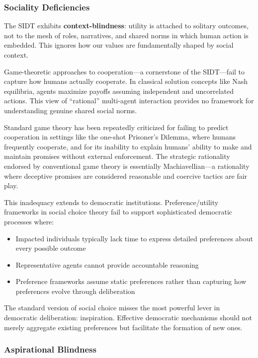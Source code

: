 \subsubsection{Sociality Deficiencies}

The SIDT exhibits \textbf{context-blindness}: utility is attached to solitary outcomes, not to the mesh of roles, narratives, and shared norms in which human action is embedded. This ignores how our values are fundamentally shaped by social context.

Game-theoretic approaches to cooperation—a cornerstone of the SIDT—fail to capture how humans actually cooperate. In classical solution concepts like Nash equilibria, agents maximize payoffs assuming independent and uncorrelated actions. This view of ``rational'' multi-agent interaction provides no framework for understanding genuine shared social norms.

Standard game theory has been repeatedly criticized for failing to predict cooperation in settings like the one-shot Prisoner's Dilemma, where humans frequently cooperate, and for its inability to explain humans' ability to make and maintain promises without external enforcement. The strategic rationality endorsed by conventional game theory is essentially Machiavellian—a rationality where deceptive promises are considered reasonable and coercive tactics are fair play.

This inadequacy extends to democratic institutions. Preference/utility frameworks in social choice theory fail to support sophisticated democratic processes where:

\begin{itemize}
\item Impacted individuals typically lack time to express detailed preferences about every possible outcome
\item Representative agents cannot provide accountable reasoning
\item Preference frameworks assume static preferences rather than capturing how preferences evolve through deliberation
\end{itemize}

The standard version of social choice misses the most powerful lever in democratic deliberation: inspiration. Effective democratic mechanisms should not merely aggregate existing preferences but facilitate the formation of new ones.

\subsubsection{Aspirational Blindness}

